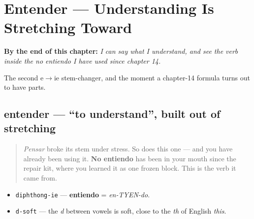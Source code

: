 
\chapter{Entender — Understanding Is Stretching Toward}
\label{ch:spanish-entender}

\begin{chapteropening}
\textbf{By the end of this chapter:} \emph{I can say what I understand, and see the verb inside the no entiendo I have used since chapter 14.}

The second e$\to$ie stem-changer, and the moment a chapter-14 formula turns out to have parts.
\end{chapteropening}

\section[entender]{entender — \textquotedblleft{}to understand\textquotedblright{}, built out of stretching}

\label{lesson:ES-C34-entender}



\begin{quote}
\emph{Pensar} broke its stem under stress. So does this one — and you have already been using it. \textbf{No entiendo} has been in your mouth since the repair kit, where you learned it as one frozen block. This is the verb it came from.
\end{quote}

\begin{sounds}
\begin{itemize}
\raggedright
  \item \texttt{diphthong-ie} — \textbf{entiendo} = \emph{en-TYEN-do}.
  \item \texttt{d-soft} — the \emph{d} between vowels is soft, close to the \emph{th} of English \emph{this}.
\end{itemize}
\end{sounds}

